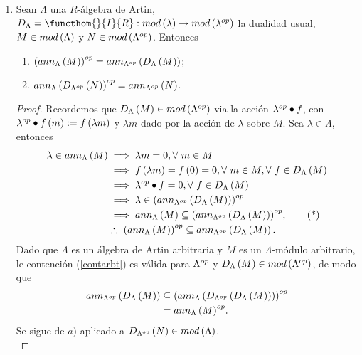 \documentclass{article}
\begin{document}
\begin{enumerate}[label=\textbf{Ej \arabic*.}]
		\item Sean $\Lambda$ una $R$-álgebra de Artin, $D_{\Lambda}=\functhom{}{I}{R}:mod\lrprth{\lambda}\to mod\lrprth{\opst{\lambda}}$ la dualidad usual, $M\in mod\left(\Lambda\right)$ y $N\in mod\left({\Lambda}^{op}\right)$. Entonces
		\begin{enumerate}
			\item  ${\left(ann_{\Lambda}\left(M\right)\right)}^{op}=ann_{{\Lambda}^{op}}\left(D_{\Lambda}\left(M\right)\right)$;
			\item ${ann_{\Lambda}\left(D_{{\Lambda}^{op}}\left(N\right)\right)}^{op}=ann_{{\Lambda}^{op}}\left(N\right)$.
		\end{enumerate}
		\begin{proof}
			Recordemos que $D_{\Lambda}\left(M\right)\in mod\left({\Lambda}^{op}\right)$ via la acción ${\lambda}^{op}\bullet f$, con ${\lambda}^{op}\bullet f\left(m\right):=f\left(\lambda m\right)$ y $\lambda m$ dado por la acción de $\lambda$ sobre $M$. Sea $\lambda\in\Lambda$, entonces
			\begin{align*}
				\lambda\in ann_{\Lambda}\lrprth{M}&\implies \lambda m=0, \forall\ m\in M\\
				&\implies f\lrprth{\lambda m}=f\lrprth{0}=0,\forall\ m\in M, \forall\ f\in D_{\Lambda}\lrprth{M}\\\
				&\implies \opst{\lambda}\bullet f=0, \forall\ f\in D_{\Lambda}\lrprth{M}\\
				&\implies \lambda\in \opst{\lrprth{ann_{\opst{\Lambda}}\lrprth{D_{\Lambda}\lrprth{M}}}}\\
				&\implies ann_{\Lambda}\lrprth{M}\subseteq \opst{\lrprth{ann_{\opst{\Lambda}}\lrprth{D_{\Lambda}\lrprth{M}}}},\tag{*}\label{contarbt}\\
				&\therefore\ \opst{\lrprth{ann_{\Lambda}\lrprth{M}}}\subseteq ann_{\opst{\Lambda}}\lrprth{D_{\Lambda}\lrprth{M}}.
			\end{align*}
			Dado que $\Lambda$ es un álgebra de Artin arbitraria y $M$ es un $\Lambda$-módulo arbitrario, le contención (\ref{contarbt}) es válida para ${\Lambda}^{op}$ y $D_{\Lambda}\left(M\right)\in mod\left({\Lambda}^{op}\right)$, de modo que
			\begin{align*}
				 ann_{{\Lambda}^{op}}\left(D_{\Lambda}\left(M\right)\right)&\subseteq { \left(ann_{\Lambda} \left(D_{ {\Lambda}^{op} } \left(D_{\Lambda} \left(M\right) \right) \right) \right) }^{op}\\
				 &={ann_{\Lambda}\left(M\right)}^{op}.
			\end{align*}
			 Se sigue de $a)$ aplicado a $D_{{\Lambda}^{op}}\left(N\right)\in mod\left(\Lambda\right)$.\\
		\end{proof}
		

\end{enumerate}
\end{document}
